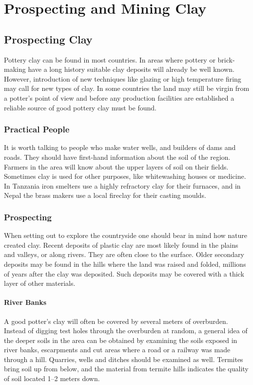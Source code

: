\chapter{Prospecting and Mining Clay}
\section{Prospecting Clay}
Pottery clay can be found in most countries. In areas where pottery or 
brick-making have a long history suitable clay deposits will already be well 
known. However, introduction of new techniques like glazing or high temperature 
firing may call for new types of clay. In some countries the land may still be 
virgin from a potter's point of view and before any production facilities are 
established a reliable source of good pottery clay must be found.
\subsection{Practical People}
It is worth talking to people who make water wells, and builders of dams and 
roads. They should have first-hand information about the soil of the region. 
Farmers in the area will know about the upper layers of soil on their fields. 
Sometimes clay is used for other purposes, like whitewashing houses or 
medicine. In Tanzania iron smelters use a highly refractory clay for their 
furnaces, and in Nepal the brass makers use a local fireclay for their casting 
moulds.
\subsection{Prospecting}
When setting out to explore the countryside one should bear in mind how nature 
created clay. Recent deposits of plastic clay are most likely found in the 
plains and valleys, or along rivers. They are often close to the surface. Older 
secondary deposits may be found in the hills where the land was raised and 
folded, millions of years after the clay was deposited. Such deposits may be 
covered with a thick layer of other materials.
\subsubsection{River Banks}
A good potter's clay will often be covered by several meters of overburden. 
Instead of digging test holes through the overburden at random, a general idea 
of the deeper soils in the area can be obtained by examining the soils exposed 
in river banks, escarpments and cut areas where a road or a railway was made 
through a hill. Quarries, wells and ditches should be examined as well. 
Termites bring soil up from below, and the material from termite hills 
indicates the quality of soil located 1--2 meters down.
